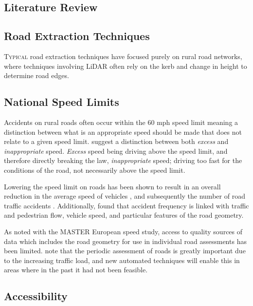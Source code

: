 \begin{multicols}{2}
\section{Literature Review}
\label{sec:literature}

\subsection{Road Extraction Techniques}

\lettrine{T}{ypical} road extraction techniques have focused purely on rural road networks, where techniques involving LiDAR often rely on the kerb and change in height to determine road edges.

\subsection{National Speed Limits}

Accidents on rural roads often occur within the 60 mph speed limit meaning a distinction between what is an appropriate speed should be made that does not relate to a given speed limit. \cite{baruya1998} suggest a distinction between both \textit{excess} and \textit{inappropriate} speed. \textit{Excess} speed being driving above the speed limit, and therefore directly breaking the law, \textit{inappropriate} speed; driving too fast for the conditions of the road, not necessarily above the speed limit.

Lowering the speed limit on roads has been shown to result in an overall reduction in the average speed of vehicles \citep{finch1994}, and subsequently the number of road traffic accidents \citep{taylor2002}. Additionally, \cite{taylor2000} found that accident frequency is linked with traffic and pedestrian flow, vehicle speed, and particular features of the road geometry.

As noted with the MASTER European speed study, access to quality sources of data which includes the road geometry for use in individual road assessments has been limited. \cite{yadev2018} note that the periodic assessment of roads is greatly important due to the increasing traffic load, and new automated techniques will enable this in areas where in the past it had not been feasible.

\subsection{Accessibility}


\end{multicols}
